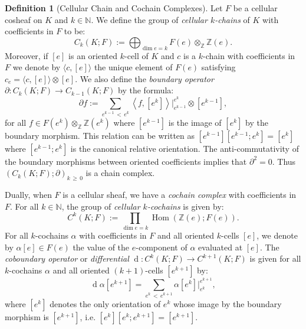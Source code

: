 \documentclass[10pt]{amsart}
\theoremstyle{definition}
\newtheorem{defi}[theo]{Definition}
\numberwithin{equation}{section}
\numberwithin{figure}{section}
\newcommand{\Z}{\mathbb{Z}}
\newcommand{\N}{\mathbb{N}}
\DeclareMathOperator{\Hom}{Hom}
\DeclareMathOperator{\df}{d}
\begin{document}
\begin{defi}[Cellular Chain and Cochain Complexes]
Let $F$ be a cellular cosheaf on $K$ and $k\in \N$. We define the group of \emph{cellular $k$-chains} of $K$ with coefficients in $F$ to be:
\begin{equation*}
C_k(K;F):=\bigoplus_{\dim e = k} F(e)\otimes_\Z\Z(e).
\end{equation*}
Moreover, if $[e]$ is an oriented $k$-cell of $K$ and $c$ is a $k$-chain with coefficients in $F$ we denote by $\langle c,[e]\rangle$ the unique element of $F(e)$ satisfying $c_e=\langle c,[e]\rangle\otimes [e]$. We also define the \emph{boundary operator} $\partial : C_k(K;F) \rightarrow C_{k-1}(K;F)$ by the formula:
\begin{equation*}
\partial f :=\sum_{e^{k-1}\,<\,e^k} \left\langle f,[e^k]\right\rangle\big|^{e^k}_{e^{k-1}}\otimes \left[e^{k-1}\right],
\end{equation*}
for all $f\in F(e^k)\otimes_\Z\Z(e^k)$ where $[e^{k-1}]$ is the image of $[e^k]$ by the boundary morphism. This relation can be written as ${[e^{k-1}][e^{k-1};e^k]=[e^k]}$ where $[e^{k-1};e^k]$ is the canonical relative orientation. The anti-commutativity of the boundary morphisms between oriented coefficients implies that $\partial^2=0$. Thus $(C_k(K;F);\partial)_{k\,\geq\,0}$ is a chain complex.


Dually, when $F$ is a cellular sheaf, we have a \emph{cochain complex} with coefficients in $F$. For all $k\in \N$, the group of \emph{cellular $k$-cochains} is given by:
\begin{equation*}
C^k(K;F):= \prod_{\dim e = k} \Hom(\Z(e);F(e)).
\end{equation*}
For all $k$-cochains $\alpha$ with coefficients in $F$ and all oriented $k$-cells $[e]$, we denote by $\alpha[e]\in F(e)$ the value of the $e$-component of $\alpha$ evaluated at $[e]$. The \emph{coboundary operator} or \emph{differential} $\df:C^k(K;F)\rightarrow C^{k+1}(K;F)$ is given for all $k$-cochains $\alpha$ and all oriented $(k+1)$-cells $[e^{k+1}]$ by:
\begin{equation*}
\df\alpha\left[e^{k+1}\right]=\sum_{e^k\,<\,e^{k+1}}\alpha\left[e^k\right]\big|^{e^{k+1}}_{e^k},
\end{equation*}
where $[e^k]$ denotes the only orientation of $e^k$ whose image by the boundary morphism is $[e^{k+1}]$, i.e. $[e^k][e^k;e^{k+1}]=[e^{k+1}]$.



\end{defi}
\end{document}
